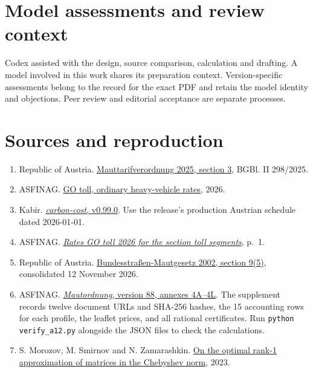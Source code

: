 \documentclass[11pt]{article}
\begin{document}
\section*{Model assessments and review context}
Codex assisted with the design, source comparison, calculation and drafting. A model involved in this work shares its preparation context. Version-specific assessments belong to the record for the exact PDF and retain the model identity and objections. Peer review and editorial acceptance are separate processes.

\section*{Sources and reproduction}
\begingroup\small\begin{enumerate}\setlength{\itemsep}{1pt}
\item Republic of Austria. \href{https://ris.bka.gv.at/eli/bgbl/ii/2025/298/P3/NOR40273503}{Mauttarifverordnung 2025, section 3}, BGBl. II 298/2025.
\item ASFINAG. \href{https://go-maut.at/go-maut-bezahlen/tarife-go-maut/}{GO toll, ordinary heavy-vehicle rates}, 2026.
\item Kabir. \href{https://doi.org/10.5281/zenodo.24406888}{\textit{carbon-cost}, v0.99.0}. Use the release's production Austrian schedule dated 2026-01-01.
\item ASFINAG. \href{https://www.go-maut.at/media/zglel2dk/go-maut-tarife-2026_streckenmaut_en.pdf}{\textit{Rates GO toll 2026 for the section toll segments}}, p.~1.
\item Republic of Austria. \href{https://www.ris.bka.gv.at/GeltendeFassung.wxe?Abfrage=Bundesnormen&FassungVom=2026-11-12&Gesetzesnummer=20002090}{Bundesstra\ss en-Mautgesetz 2002, section 9(5)}, consolidated 12 November 2026.
\item ASFINAG. \href{https://www.asfinag.at/maut-vignette/mautordnung/}{\textit{Mautordnung}, version 88, annexes 4A--4L}. The supplement records twelve document URLs and SHA-256 hashes, the 15 accounting rows for each profile, the leaflet prices, and all rational certificates. Run \texttt{python verify\_a12.py} alongside the JSON files to check the calculations.
\item S. Morozov, M. Smirnov and N. Zamarashkin. \href{https://arxiv.org/abs/2212.01438}{On the optimal rank-1 approximation of matrices in the Chebyshev norm}, 2023.
\end{enumerate}\endgroup
\end{document}
